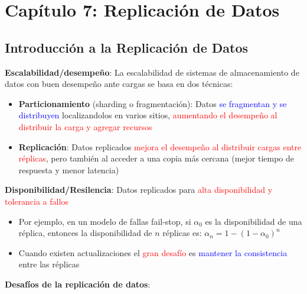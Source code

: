 \section{Capítulo 7: Replicación de Datos} 
\subsection{Introducción a la Replicación de Datos}

\textbf{Escalabilidad/desempeño}: La escalabilidad de sistemas de almacenamiento de datos con buen desempeño ante cargas se basa en dos técnicas: 

\begin{itemize}
    \item \textbf{Particionamiento} (sharding o fragmentación): Datos \textcolor{blue}{se fragmentan y se distribuyen} localizandolos en varios sitios,  \textcolor{red}{aumentando el desempeño al distribuir la carga y agregar recursos}
    \item \textbf{Replicación}: Datos replicados \textcolor{red}{mejora el desempeño al distribuir cargas entre réplicas}, pero también al acceder a una copia más cercana (mejor tiempo de respuesta y menor latencia)
\end{itemize}

\textbf{Disponibilidad/Resilencia}: Datos replicados para \textcolor{red}{alta disponibilidad y tolerancia a fallos}

\begin{itemize}
    \item Por ejemplo, en un modelo de fallas fail-stop, si $\alpha_0$ es la disponibilidad de una réplica, entonces la disponibilidad de $n$ réplicas es: $\alpha_n = 1 - (1 - \alpha_0)^n$
    \item Cuando existen actualizaciones el \textcolor{red}{gran desafío} es \textcolor{blue}{mantener la consistencia} entre las réplicas
\end{itemize}

\textbf{Desafíos de la replicación de datos}:

